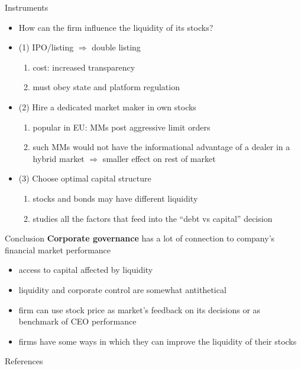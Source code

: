 \documentclass[english,10pt
,aspectratio=169
]{beamer}
\begin{document}
\begin{frame}{Instruments}
	\begin{itemize}
		\item How can the firm influence the liquidity of its stocks?
		\item (1) IPO/listing $\Rightarrow$ double listing
		\begin{enumerate}
			\item cost: increased transparency
			\item must obey state and platform regulation
		\end{enumerate}
		\item (2) Hire a dedicated market maker in own stocks
		\begin{enumerate}
			\item popular in EU: MMs post aggressive limit orders
			\item such MMs would not have the informational advantage of a dealer in a hybrid market $\Rightarrow$ smaller effect on rest of market
		\end{enumerate}
		\item (3) Choose optimal capital structure
		\begin{enumerate}
			\item stocks and bonds may have different liquidity
			\item {} studies all the factors that feed into the ``debt vs capital'' decision
		\end{enumerate}
	\end{itemize}
\end{frame}


\begin{frame}{Conclusion}
	\textbf{Corporate governance} has a lot of connection to company's financial market performance
	\begin{itemize}
		\item access to capital affected by liquidity
		\item liquidity and corporate control are somewhat antithetical
		\item firm can use stock price as market's feedback on its decisions or as benchmark of CEO performance
		\item firms have some ways in which they can improve the liquidity of their stocks
	\end{itemize}
\end{frame}


\appendix
\begin{frame}[allowframebreaks]{References}
	
	
\end{frame}
\end{document}
